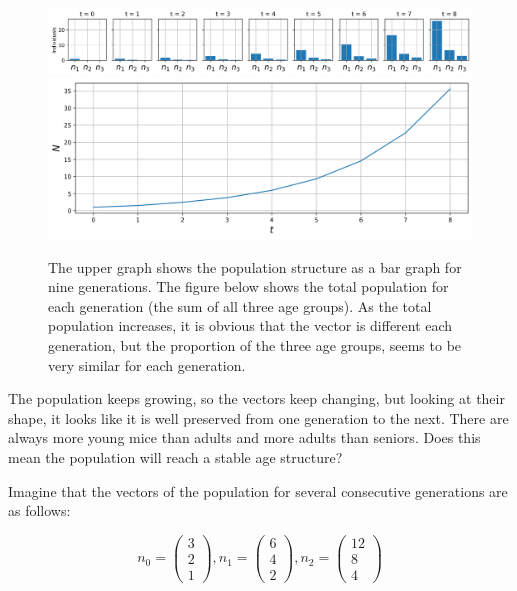 \documentclass{tufte-book} %
\begin{document}
\begin{figure}
\begin{center}
\includegraphics[width=\linewidth]{pop_evol}
\includegraphics[width=\linewidth]{tot_pop_evol}		
\end{center}
\caption{The upper graph shows the population structure as a bar graph for nine generations. The figure below shows the total population for each generation (the sum of all three age groups). As the total population increases, it is obvious that the vector is different each generation, but the proportion of the three age groups, seems to be very similar for each generation.}
\label{fig:Lpop}
\end{figure}




The population keeps growing, so the vectors keep changing, but looking at their shape, it looks like it is well preserved from one generation to the next. There are always more young mice than adults and more adults than seniors. Does this mean the population will reach a stable age structure?

Imagine that the vectors of the population for several consecutive generations are as follows:

\begin{equation}
	n_0 = \begin{pmatrix} 3\\ 2 \\ 1\end{pmatrix}, 
	n_1 = \begin{pmatrix} 6\\ 4 \\ 2\end{pmatrix}, 
	n_2 = \begin{pmatrix} 12\\ 8 \\ 4\end{pmatrix}
\end{equation}
\end{document}
